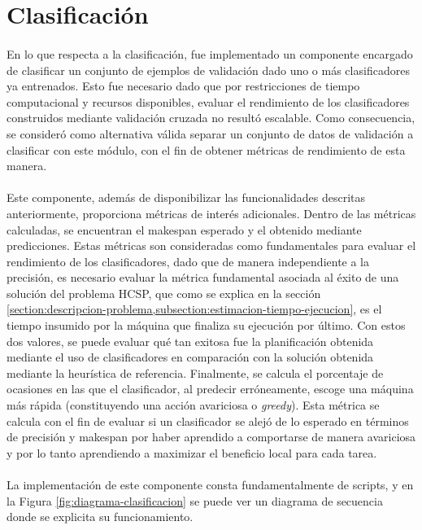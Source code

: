 \section{Clasificación} \label{chapter-implementacion:clasificacion}

\paragraph{} En lo que respecta a la clasificación, fue implementado un componente encargado de clasificar un conjunto de ejemplos de validación dado uno o más clasificadores ya entrenados. Esto fue necesario dado que por restricciones de tiempo computacional y recursos disponibles, evaluar el rendimiento de los clasificadores construidos mediante validación cruzada no resultó escalable. Como consecuencia, se consideró como alternativa válida separar un conjunto de datos de validación a clasificar con este módulo, con el fin de obtener métricas de rendimiento de esta manera.

\paragraph{} Este componente, además de disponibilizar las funcionalidades descritas anteriormente, proporciona métricas de interés adicionales. Dentro de las métricas calculadas, se encuentran el makespan esperado y el obtenido mediante predicciones. Estas métricas son consideradas como fundamentales para evaluar el rendimiento de los clasificadores, dado que de manera independiente a la precisión, es necesario evaluar la métrica fundamental asociada al éxito de una solución del problema HCSP, que como se explica en la sección \ref{section:descripcion-problema,subsection:estimacion-tiempo-ejecucion}, es el tiempo insumido por la máquina que finaliza su ejecución por último. Con estos dos valores, se puede evaluar qué tan exitosa fue la planificación obtenida mediante el uso de clasificadores en comparación con la solución obtenida mediante la heurística de referencia. Finalmente, se calcula el porcentaje de ocasiones en las que el clasificador, al predecir erróneamente, escoge una máquina más rápida (constituyendo una acción avariciosa o \textit{greedy}). Esta métrica se calcula con el fin de evaluar si un clasificador se alejó de lo esperado en términos de precisión y makespan por haber aprendido a comportarse de manera avariciosa y por lo tanto aprendiendo a maximizar el beneficio local para cada tarea.

\paragraph{} La implementación de este componente consta fundamentalmente de scripts, y en la Figura \ref{fig:diagrama-clasificacion} se puede ver un diagrama de secuencia donde se explicita su funcionamiento.

